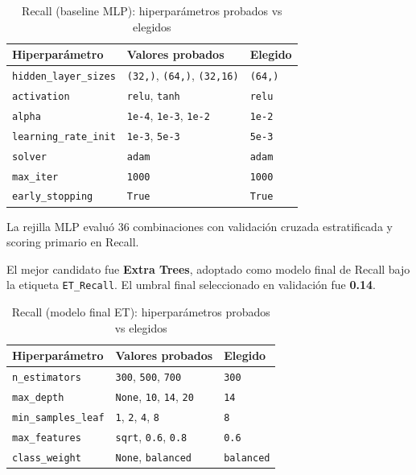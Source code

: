\begin{table}[h]
\centering
\small
\caption{Recall (baseline MLP): hiperparámetros probados vs elegidos}
\label{tab:rec_hparams_mlp}
\begin{tabular}{p{}p{}p{}}
\toprule
\textbf{Hiperparámetro} & \textbf{Valores probados} & \textbf{Elegido} \\
\midrule
\texttt{hidden\_layer\_sizes} & \texttt{(32,)}, \texttt{(64,)}, \texttt{(32,16)} & \texttt{(64,)} \\
\texttt{activation} & \texttt{relu}, \texttt{tanh} & \texttt{relu} \\
\texttt{alpha} & \texttt{1e-4}, \texttt{1e-3}, \texttt{1e-2} & \texttt{1e-2} \\
\texttt{learning\_rate\_init} & \texttt{1e-3}, \texttt{5e-3} & \texttt{5e-3} \\
\texttt{solver} & \texttt{adam} & \texttt{adam} \\
\texttt{max\_iter} & \texttt{1000} & \texttt{1000} \\
\texttt{early\_stopping} & \texttt{True} & \texttt{True} \\
\bottomrule
\end{tabular}
\end{table}

La rejilla MLP evaluó 36 combinaciones con validación cruzada estratificada y scoring primario en Recall.

El mejor candidato fue \textbf{Extra Trees}, adoptado como modelo final de Recall bajo la etiqueta \texttt{ET\_Recall}. El umbral final seleccionado en validación fue \textbf{0.14}.

\begin{table}[h]
\centering
\small
\caption{Recall (modelo final ET): hiperparámetros probados vs elegidos}
\label{tab:rec_hparams_et}
\begin{tabular}{p{}p{}p{}}
\toprule
\textbf{Hiperparámetro} & \textbf{Valores probados} & \textbf{Elegido} \\
\midrule
\texttt{n\_estimators} & \texttt{300}, \texttt{500}, \texttt{700} & \texttt{300} \\
\texttt{max\_depth} & \texttt{None}, \texttt{10}, \texttt{14}, \texttt{20} & \texttt{14} \\
\texttt{min\_samples\_leaf} & \texttt{1}, \texttt{2}, \texttt{4}, \texttt{8} & \texttt{8} \\
\texttt{max\_features} & \texttt{sqrt}, \texttt{0.6}, \texttt{0.8} & \texttt{0.6} \\
\texttt{class\_weight} & \texttt{None}, \texttt{balanced} & \texttt{balanced} \\
\bottomrule
\end{tabular}
\end{table}

